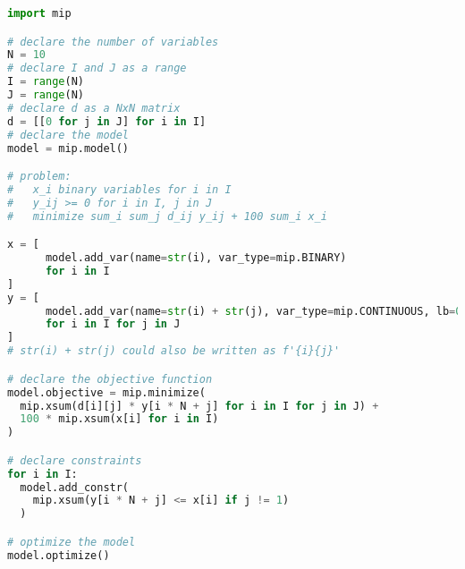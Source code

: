 \documentclass[english]{article}
\begin{document}
\begin{lstlisting}[label={lst:mip-library-quick-reference}, caption={Python \texttt{mip} library quick reference}, language=Python]
import mip

# declare the number of variables
N = 10
# declare I and J as a range
I = range(N)
J = range(N)
# declare d as a NxN matrix
d = [[0 for j in J] for i in I]
# declare the model
model = mip.model()

# problem:
#   x_i binary variables for i in I
#   y_ij >= 0 for i in I, j in J
#   minimize sum_i sum_j d_ij y_ij + 100 sum_i x_i

x = [
      model.add_var(name=str(i), var_type=mip.BINARY)
      for i in I
]
y = [
      model.add_var(name=str(i) + str(j), var_type=mip.CONTINUOUS, lb=0)
      for i in I for j in J
]
# str(i) + str(j) could also be written as f'{i}{j}'

# declare the objective function
model.objective = mip.minimize(
  mip.xsum(d[i][j] * y[i * N + j] for i in I for j in J) +
  100 * mip.xsum(x[i] for i in I)
)

# declare constraints
for i in I:
  model.add_constr(
    mip.xsum(y[i * N + j] <= x[i] if j != 1)
  )

# optimize the model
model.optimize()
\end{lstlisting}
\end{document}
